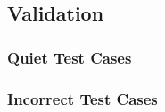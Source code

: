 \subsection{Validation}


\subsubsection{Quiet Test Cases}



\subsubsection{Incorrect Test Cases}


